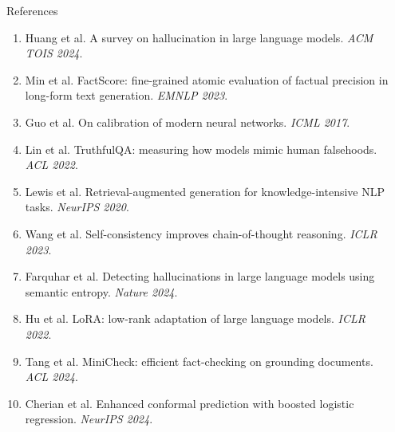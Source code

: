 \documentclass[final]{beamer}
\newlength{\sepwidth}
\newlength{\colwidth}
\newcommand{\separatorcolumn}{\begin{column}{\sepwidth}\end{column}}
\begin{document}
\begin{frame}[t]
\begin{columns}[t]
\begin{column}{\colwidth}
  \begin{block}{References}
    \scriptsize
    \begin{enumerate}\setlength{\itemsep}{0.05em}\setlength{\parskip}{0pt}
      \item Huang et al. A survey on hallucination in large language models. \emph{ACM TOIS 2024}.
      \item Min et al. FactScore: fine-grained atomic evaluation of factual precision in long-form text generation. \emph{EMNLP 2023}.
      \item Guo et al. On calibration of modern neural networks. \emph{ICML 2017}.
      \item Lin et al. TruthfulQA: measuring how models mimic human falsehoods. \emph{ACL 2022}.
      \item Lewis et al. Retrieval-augmented generation for knowledge-intensive NLP tasks. \emph{NeurIPS 2020}.
      \item Wang et al. Self-consistency improves chain-of-thought reasoning. \emph{ICLR 2023}.
      \item Farquhar et al. Detecting hallucinations in large language models using semantic entropy. \emph{Nature 2024}.
      \item Hu et al. LoRA: low-rank adaptation of large language models. \emph{ICLR 2022}.
      \item Tang et al. MiniCheck: efficient fact-checking on grounding documents. \emph{ACL 2024}.
      \item Cherian et al. Enhanced conformal prediction with boosted logistic regression. \emph{NeurIPS 2024}.
    \end{enumerate}
  \end{block}

\end{column}

\separatorcolumn
\end{columns}
\end{frame}
\end{document}
